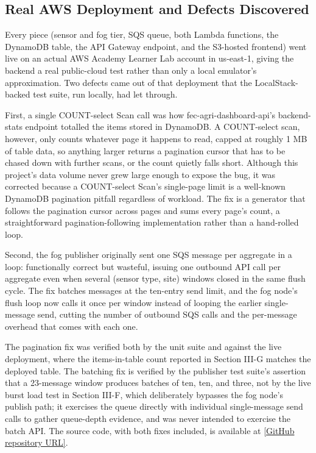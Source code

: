 \documentclass[conference]{IEEEtran}
\begin{document}
\subsection{Real AWS Deployment and Defects Discovered}
Every piece (sensor and fog tier, SQS queue, both Lambda functions, the DynamoDB table, the API Gateway endpoint, and the S3-hosted frontend) went live on an actual AWS Academy Learner Lab account in us-east-1, giving the backend a real public-cloud test rather than only a local emulator's approximation. Two defects came out of that deployment that the LocalStack-backed test suite, run locally, had let through.

First, a single COUNT-select Scan call was how fec-agri-dashboard-api's backend-stats endpoint totalled the items stored in DynamoDB. A COUNT-select scan, however, only counts whatever page it happens to read, capped at roughly 1 MB of table data, so anything larger returns a pagination cursor that has to be chased down with further scans, or the count quietly falls short. Although this project's data volume never grew large enough to expose the bug, it was corrected because a COUNT-select Scan's single-page limit is a well-known DynamoDB pagination pitfall regardless of workload. The fix is a generator that follows the pagination cursor across pages and sums every page's count, a straightforward pagination-following implementation rather than a hand-rolled loop.

Second, the fog publisher originally sent one SQS message per aggregate in a loop: functionally correct but wasteful, issuing one outbound API call per aggregate even when several (sensor type, site) windows closed in the same flush cycle. The fix batches messages at the ten-entry send limit, and the fog node's flush loop now calls it once per window instead of looping the earlier single-message send, cutting the number of outbound SQS calls and the per-message overhead that comes with each one.

The pagination fix was verified both by the unit suite and against the live deployment, where the items-in-table count reported in Section III-G matches the deployed table. The batching fix is verified by the publisher test suite's assertion that a 23-message window produces batches of ten, ten, and three, not by the live burst load test in Section III-F, which deliberately bypasses the fog node's publish path; it exercises the queue directly with individual single-message send calls to gather queue-depth evidence, and was never intended to exercise the batch API. The source code, with both fixes included, is available at \href{[GitHub repository URL]}{[GitHub repository URL]}.
\end{document}
